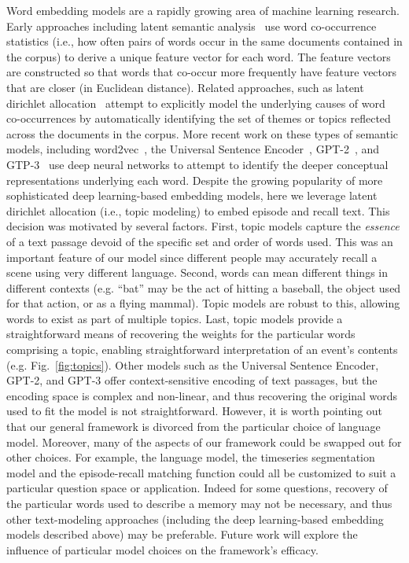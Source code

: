 \documentclass{article}
\begin{document}
Word embedding models are a rapidly growing area of machine learning research.  Early approaches including latent
  semantic analysis~\citep{LandDuma97} use word co-occurrence statistics (i.e., how often pairs of words occur in the same documents contained in the corpus) to derive a unique feature vector for each word.  The feature vectors are constructed so that words that co-occur more frequently have feature vectors that are closer (in Euclidean distance).  Related approaches, such as latent dirichlet
  allocation~\citep{BleiEtal03} attempt to explicitly model the underlying causes of word co-occurrences by automatically identifying the set of themes or topics reflected across the documents in the corpus.  More recent work on these types of semantic models, including word2vec~\citep{MikoEtal13}, the Universal Sentence Encoder~\citep{CerEtal18}, GPT-2~\citep{RadfEtal19}, and GTP-3~\citep{BrowEtal20} use deep neural networks to attempt to identify the deeper conceptual representations underlying each word.  Despite the growing popularity of more sophisticated deep learning-based embedding models, here we leverage latent dirichlet allocation (i.e., topic modeling) to embed episode and recall text.  This decision was motivated by several factors.  First, topic models capture the \textit{essence} of a text passage devoid of the specific set and order of words used.  This was an important feature of our model since different people may accurately recall a scene using very different language. Second, words can mean different things in different contexts (e.g. ``bat'' may be the act of hitting a baseball, the object used for that action, or as a flying mammal).  Topic models are robust to this, allowing words to exist as part of multiple topics.  Last, topic models provide a straightforward means of recovering the weights for the particular words comprising a topic, enabling straightforward interpretation of an event's contents (e.g. Fig.~\ref{fig:topics}). Other models such as the Universal Sentence Encoder, GPT-2, and GPT-3 offer context-sensitive encoding of text passages, but the encoding space is complex and non-linear, and thus recovering the original words used to fit the model is not straightforward. However, it is worth pointing out that our general framework is divorced from the particular choice of language model. Moreover, many of the aspects of our framework could be swapped out for other choices. For example, the language model, the timeseries segmentation model and the episode-recall matching function could all be customized to suit a particular question space or application. Indeed for some questions, recovery of the particular words used to describe a memory may not be necessary, and thus other text-modeling approaches (including the deep learning-based embedding models described above) may be preferable. Future work will explore the influence of particular model choices on the framework's efficacy.
\end{document}

